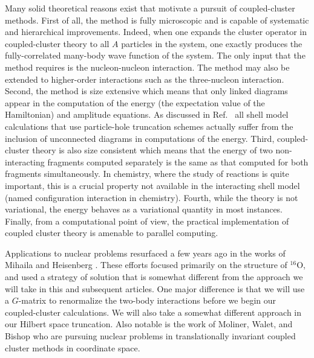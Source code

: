 \documentclass[aps,prc,twocolumn,floatfix]{revtex4}
\begin{document}
Many solid theoretical reasons exist that motivate a pursuit of
coupled-cluster methods. First of all, the method is fully 
microscopic and is capable of systematic and hierarchical improvements.
Indeed, when one expands the cluster operator in coupled-cluster theory
to all $A$ particles in the system, one exactly produces the fully-correlated
many-body wave function of the system. The only input that the method
requires is the nucleon-nucleon interaction. 
The method may also be extended
to higher-order interactions such as the three-nucleon interaction. 
Second, the method is size extensive which means that only linked 
diagrams appear in the computation of the 
energy (the expectation value of the Hamiltonian) and amplitude equations. 
As discussed in Ref.~\cite{comp_chem_rev00} all shell model calculations 
that use particle-hole truncation schemes
actually suffer from the inclusion of unconnected diagrams 
in computations of the energy. 
Third, coupled-cluster theory is also size
consistent which means that the energy of two non-interacting fragments 
computed separately is the same as that computed for both fragments
simultaneously. In chemistry, where the study of reactions 
is quite important, this is a crucial property not available
in the interacting shell model (named configuration interaction in
chemistry).
Fourth, while the theory 
is not variational, 
the energy behaves as a variational quantity in most instances. 
Finally, from a 
computational point of view, the practical implementation of coupled 
cluster theory is amenable to parallel computing. 

Applications to nuclear problems resurfaced a few
years ago in the works of Mihaila and Heisenberg \cite{mh00a,mh00b,mh99,hm99}.
These efforts focused primarily on the structure of
$^{16}$O, and used a strategy of solution that is somewhat different
from the approach we will take in this and subsequent articles. One 
major difference is that we will use a $G$-matrix to renormalize the
two-body interactions before we begin our coupled-cluster calculations. 
We will also take a somewhat different approach in our Hilbert 
space truncation. Also notable is the work of Moliner, Walet, and Bishop
\cite{mwb02} who are pursuing nuclear problems in translationally 
invariant coupled cluster methods in coordinate space.
\end{document}
